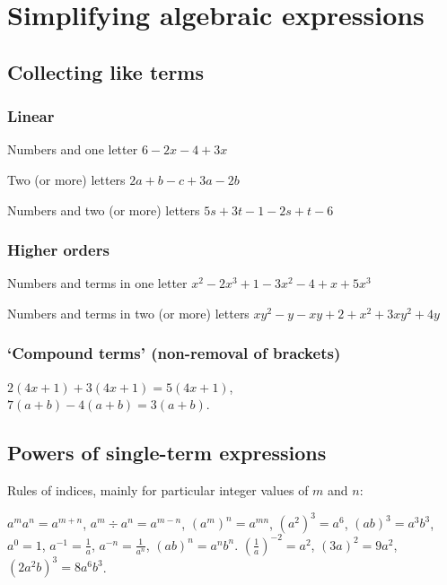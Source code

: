 \documentclass{article}
\begin{document}
\section{Simplifying algebraic expressions}

\subsection{Collecting like terms}

\subsubsection{Linear}

Numbers and one letter \hfill \(6-2x-4 + 3x\)

Two (or more) letters \hfill \(2a + b - c + 3a - 2b\)

Numbers and two (or more) letters \hfill  \(5s + 3t - 1 - 2s + t - 6\)

\subsubsection{Higher orders}

Numbers and terms in one letter \hfill \(x^2 - 2x^3 + 1 - 3x^2 - 4 + x + 5x^3\)

Numbers and terms in two (or more) letters \hfill  \(xy^2 - y - xy + 2 + x^2 + 3xy^2 + 4y\)

\subsubsection{\lq Compound terms' (non-removal of brackets)}

\begin{flushright}
\(2(4x+1)+3(4x+1) = 5(4x+1)\), \\
\(7(a+b) - 4(a+b) = 3(a+b)\).
\end{flushright}

\subsection{Powers of single-term expressions}

Rules of indices, mainly for particular integer values of \(m\) and \(n\):

\(a^ma^n = a^{m+n}\), \(a^m \div a^n = a^{m-n}\), \((a^m)^n = a^{mn}\), \hfill \((a^2)^3 = a^6\), \((ab)^3 = a^3b^3\), \\
\(a^0 = 1\), \(a^{-1} = \frac{1}{a}\), \(a^{-n} = \frac{1}{a^n}\), \((ab)^n = a^nb^n\). \hfill \(\left(  \frac{1}{a} \right)  ^{-2} = a^2\), \((3a)^2 = 9a^2\), \((2a^2b)^3 = 8a^6b^3\).
\end{document}
